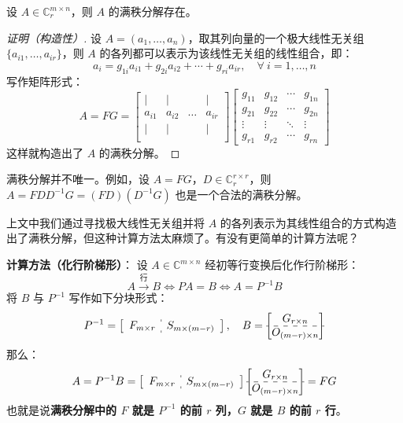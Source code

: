\begin{theorem}
设 $A\in\mathbb C^{m\times n}_r$，则 $A$ 的满秩分解存在。
\end{theorem}
\begin{proof}[证明（构造性）]
设 $A=(a_1,\ldots,a_n)$，取其列向量的一个极大线性无关组 $\{a_{i1},\ldots,a_{ir}\}$，则 $A$ 的各列都可以表示为该线性无关组的线性组合，即：
\[
    a_i=g_{1i}a_{i1}+g_{2i}a_{i2}+\cdots+g_{ri}a_{ir},\quad\forall\ i=1,\ldots,n
\]
写作矩阵形式：
\[
    A=FG=
    \begin{bmatrix}
    |&|&&|\\
    a_{i1}&a_{i2}&\ldots&a_{ir}\\
    |&|&&|\\
    \end{bmatrix}
    \begin{bmatrix}
    g_{11}&g_{12}&\cdots&g_{1n}\\
    g_{21}&g_{22}&\cdots&g_{2n}\\
    \vdots&\vdots&\ddots&\vdots\\
    g_{r1}&g_{r2}&\cdots&g_{rn}
    \end{bmatrix}
\]
这样就构造出了 $A$ 的满秩分解。
\end{proof}
\begin{note}
满秩分解并不唯一。例如，设 $A=FG$，$D\in\mathbb C^{r\times r}_r$，则 $A=FDD^{-1}G=(FD)(D^{-1}G)$ 也是一个合法的满秩分解。
\end{note}

上文中我们通过寻找极大线性无关组并将 $A$ 的各列表示为其线性组合的方式构造出了满秩分解，但这种计算方法太麻烦了。有没有更简单的计算方法呢？

\vskip 10pt \noindent\textbf{计算方法（化行阶梯形）}：
设 $A\in\mathbb C^{m\times n}$ 经初等行变换后化作行阶梯形：
\[
    A\xrightarrow{\text{行}} B\iff PA=B\iff A=P^{-1}B
\]
将 $B$ 与 $P^{-1}$ 写作如下分块形式：
\[
    P^{-1}=\left[\begin{array}{c:c}F_{m\times r}&S_{m\times(m-r)}
    \end{array}\right],\quad
    B=\begin{bmatrix}G_{r\times n}\\\hdashline O_{(m-r)\times n}\end{bmatrix}
\]
那么：
\[
    A=P^{-1}B=\left[\begin{array}{c:c}F_{m\times r}&S_{m\times(m-r)}
    \end{array}\right]\begin{bmatrix}G_{r\times n}\\\hdashline O_{(m-r)\times n}\end{bmatrix}=FG
\]
也就是说\textbf{满秩分解中的 $F$ 就是 $P^{-1}$ 的前 $r$ 列，$G$ 就是 $B$ 的前 $r$ 行}。

